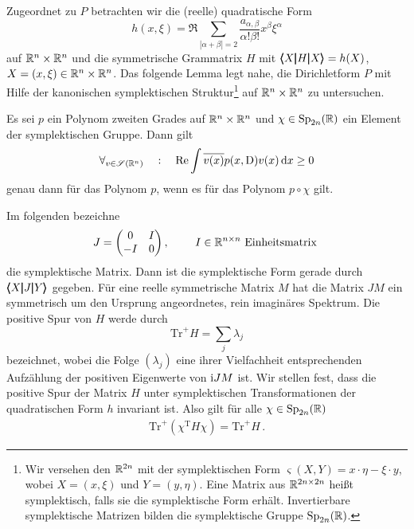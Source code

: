 Zugeordnet zu $P$ betrachten wir die (reelle) quadratische Form
\begin{equation}
  h(x,\xi) = \Re  \sum_{|\alpha+\beta|= 2} \frac{a_{\alpha,\beta}}{\alpha!\beta!} x^\beta\xi^\alpha
\end{equation}
auf $\mathbb R^n\times\mathbb R^n$ und die symmetrische Grammatrix $H$ mit $\pmb\langle X\pmb|H\pmb|X\pmb\rangle=h(X)$, $X=(x,\xi)\in\mathbb R^n\times\mathbb R^n$.  Das folgende Lemma legt nahe, die Dirichletform $P$ mit Hilfe der kanonischen symplektischen Struktur\footnote{Wir versehen den $\mathbb R^{2n}$ mit der symplektischen Form
$\varsigma(X,Y) = x\cdot \eta - \xi\cdot y$, wobei $X=(x,\xi)$ und $Y=(y,\eta)$. Eine Matrix aus $\mathbb R^{2n\times 2n}$ heißt symplektisch, falls sie die symplektische Form erhält. Invertierbare symplektische Matrizen bilden die symplektische Gruppe $\mathrm{Sp}_{2n}(\mathbb R)$.} auf $\mathbb R^n\times\mathbb R^n$ zu untersuchen.
\begin{lem}
Es sei $p$ ein Polynom zweiten Grades auf $\mathbb R^n\times\mathbb R^n$ und $\chi\in\mathrm{Sp}_{2n}(\mathbb R)$ ein Element der symplektischen Gruppe. Dann gilt
\begin{align}
\forall_{v\in\mathscr S(\mathbb R^n)} \quad:\quad \operatorname{Re} \int \overline{v(x)}p(x,\mathrm D)v(x)\,\mathrm d x\ge 0
\end{align}
genau dann für das Polynom $p$, wenn es für das Polynom $p\circ \chi$ gilt.
\end{lem}
Im folgenden bezeichne
\begin{align}
J=\begin{pmatrix}
0 & I\\
-I& 0 
\end{pmatrix},\qquad\text{ $ I \in\mathbb R^{n\times n}$  Einheitsmatrix }
\end{align}
die symplektische Matrix. Dann ist die symplektische Form gerade durch $\pmb\langle X\pmb|J\pmb|Y\pmb\rangle$ gegeben. Für eine reelle symmetrische Matrix $M$ hat  die Matrix $JM$ ein symmetrisch um den Ursprung angeordnetes, rein imaginäres Spektrum. Die positive Spur von $H$ werde durch
\begin{equation}
   {\mathrm{Tr}}^+ H = \sum_j\lambda_j 
\end{equation}
bezeichnet, wobei die Folge $(\lambda_j)$ eine ihrer Vielfachheit entsprechenden Aufzählung der positiven Eigenwerte von $\mathrm i JM$ ist. Wir stellen fest, dass die positive Spur
der Matrix $H$ unter symplektischen Transformationen der quadratischen Form $h$ invariant ist. Also gilt für alle $\chi\in\mathrm{Sp}_{2n}(\mathbb R)$
\begin{align}
\mathrm{Tr}^+(\chi^\mathrm{T}H\chi) = \mathrm{Tr}^+ H\,.
\end{align}

